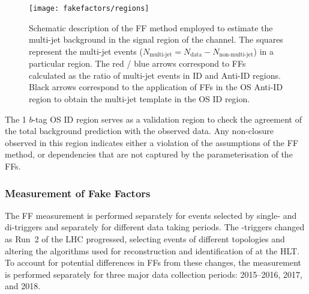 \begin{figure}[htbp]
  \centering

  \texttt{[image: fakefactors/regions]}

  \caption{Schematic description of the FF method employed to estimate the
    multi-jet background in the signal region of the \hadhad channel. The
    squares represent the multi-jet events
    ($N_\text{multi-jet} = N_\text{data} - N_\text{non-multi-jet}$) in a
    particular region. The red / blue arrows correspond to FFs calculated as the
    ratio of multi-jet events in ID and Anti-ID regions. Black arrows correspond
    to the application of FFs in the OS Anti-ID region to obtain the multi-jet
    template in the OS ID region.}
  \label{fig:fakefactor_regions}
\end{figure}

The 1 $b$-tag OS ID region serves as a validation region to check the agreement
of the total background prediction with the observed data. Any non-closure
observed in this region indicates either a violation of the assumptions of the
FF method, or dependencies that are not captured by the parameterisation of the
FFs.



\subsubsection{Measurement of Fake Factors}

The FF measurement is performed separately for events selected by single- and
di-\tauhadvis triggers and separately for different data taking periods. The
\tauhadvis-triggers changed as Run~2 of the LHC progressed, selecting events of
different topologies and altering the algorithms used for reconstruction and
identification of \tauhadvis at the HLT. To account for potential differences in
FFs from these changes, the measurement is performed separately for three major
data collection periods: 2015--2016, 2017, and 2018.

